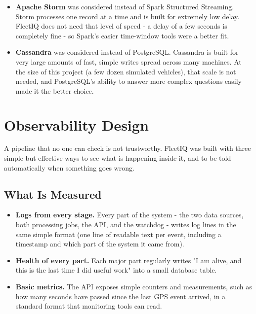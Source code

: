\documentclass[12pt,a4paper]{article}
\begin{document}
\begin{itemize}
  \item \textbf{Apache Storm} was considered instead of Spark Structured
    Streaming. Storm processes one record at a time and is built for
    extremely low delay. FleetIQ does not need that level of speed - a
    delay of a few seconds is completely fine - so Spark's easier
    time-window tools were a better fit.
  \item \textbf{Cassandra} was considered instead of PostgreSQL. Cassandra
    is built for very large amounts of fast, simple writes spread across
    many machines. At the size of this project (a few dozen simulated
    vehicles), that scale is not needed, and PostgreSQL's ability to answer
    more complex questions easily made it the better choice.
\end{itemize}

\section{Observability Design}

A pipeline that no one can check is not trustworthy. FleetIQ was built with
three simple but effective ways to see what is happening inside it, and to
be told automatically when something goes wrong.

\subsection{What Is Measured}

\begin{itemize}
  \item \textbf{Logs from every stage.} Every part of the system - the
    two data sources, both processing jobs, the API, and the watchdog -
    writes log lines in the same simple format (one line of readable text
    per event, including a timestamp and which part of the system it came
    from).
  \item \textbf{Health of every part.} Each major part regularly writes
    "I am alive, and this is the last time I did useful work" into a small
    database table.
  \item \textbf{Basic metrics.} The API exposes simple counters and
    measurements, such as how many seconds have passed since the last GPS
    event arrived, in a standard format that monitoring tools can read.
\end{itemize}
\end{document}
